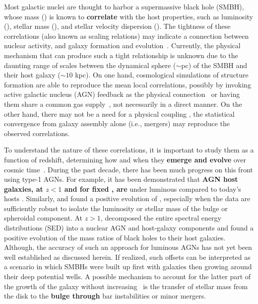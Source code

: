 \documentclass[apj]{emulateapj}
\begin{document}
Most galactic nuclei are thought to harbor a supermassive black hole (SMBH), whose mass (\mbh) is known to {\bf correlate} with the host properties, such as luminosity (\lhost), stellar mass (\smass), and stellar velocity dispersion (\sigstar). The tightness of these correlations (also known as scaling relations) may indicate a connection between nuclear activity, and galaxy formation and evolution~\citep[e.g.,][]{Mag++98, F+M00, M+H03, Gul++09,Beifi2012, H+R04, Geb++01b, Gra++2011}. Currently, the physical mechanism that can produce such a tight relationship is unknown due to the daunting range of scales between the dynamical sphere ($\sim$pc) of the SMBH and their host galaxy ($\sim10$ kpc). On one hand, cosmological simulations of structure formation are able to reproduce the mean local correlations, possibly by invoking active galactic nucleus (AGN) feedback as the physical connection~\citep{Springel2005, Hopkins2008, Matteo2008, DeG++15} or having them share a common gas supply~\citep{Cen2015, Menci2016}, not necessarily in a direct manner.
On the other hand, there may not be a need for a physical coupling \citep{Peng2007, Jahnke2011, Hirschmann2010}, the statistical convergence from galaxy assembly alone (i.e., mergers) may reproduce the observed correlations.

To understand the nature of these correlations, it is important to study them as a function of redshift, determining how and when they {\bf emerge and evolve} over cosmic time~\citep[e.g.,][]{TMB04,Sal++06,Woo++06, Jah++09,SS13,Sun2015}. During the past decade, there has been much progress on this front using type-1 AGNs. For example, it has been demonstrated that {\bf AGN host galaxies, at $z<1$ and for fixed \mbh, are} under luminous compared to today's hosts \citep{Park15, Tre++07, Pen++06qsob}. Similarly, \citet{Bennert11} and \citet{Woo++08} found a positive evolution of \mbh, especially when the data are sufficiently robust to isolate the luminosity or stellar mass of the bulge or spheroidal component. At $z>1$, \citet{Merloni2010} decomposed the entire spectral energy distributions (SED) into a nuclear AGN and host-galaxy components and found a positive evolution of the mass ratios of black holes to their host galaxies. Although, the accuracy of such an approach for luminous AGNs has not yet been well established as discussed herein. If realized, such offsets can be interpreted as a scenario in which SMBHs were built up first with galaxies then growing around their deep potential wells.  A possible mechanism to account for the latter part of the growth of the galaxy without increasing \mbh\ is the transfer of stellar mass from the disk to the {\bf bulge \citep{Jah++09,Bennert++2011,SS13} through} bar instabilities or minor mergers. 
\end{document}
